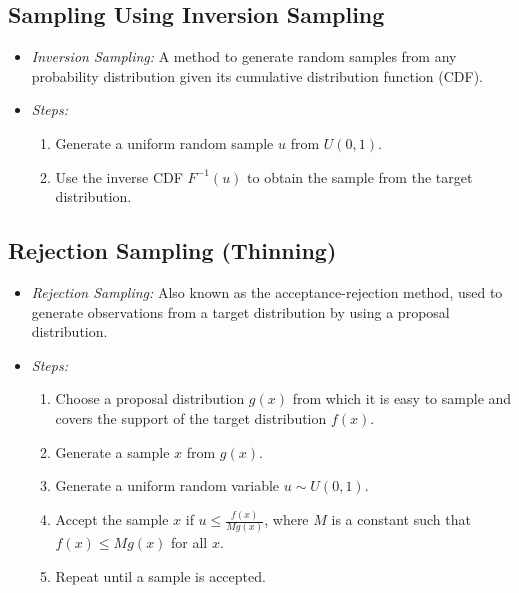 \documentclass[12pt]{article}
\begin{document}
\subsection{Sampling Using Inversion Sampling}
\begin{itemize}
    \item \textit{Inversion Sampling:} A method to generate random samples from any probability distribution given its cumulative distribution function (CDF).
    \item \textit{Steps:}
    \begin{enumerate}
        \item Generate a uniform random sample \( u \) from \( U(0, 1) \).
        \item Use the inverse CDF \( F^{-1}(u) \) to obtain the sample from the target distribution.
    \end{enumerate}
\end{itemize}

\subsection{Rejection Sampling (Thinning)}
\begin{itemize}
    \item \textit{Rejection Sampling:} Also known as the acceptance-rejection method, used to generate observations from a target distribution by using a proposal distribution.
    \item \textit{Steps:}
    \begin{enumerate}
        \item Choose a proposal distribution \( g(x) \) from which it is easy to sample and covers the support of the target distribution \( f(x) \).
        \item Generate a sample \( x \) from \( g(x) \).
        \item Generate a uniform random variable \( u \sim U(0, 1) \).
        \item Accept the sample \( x \) if \( u \leq \frac{f(x)}{M g(x)} \), where \( M \) is a constant such that \( f(x) \leq M g(x) \) for all \( x \).
        \item Repeat until a sample is accepted.
    \end{enumerate}
\end{itemize}
\end{document}
